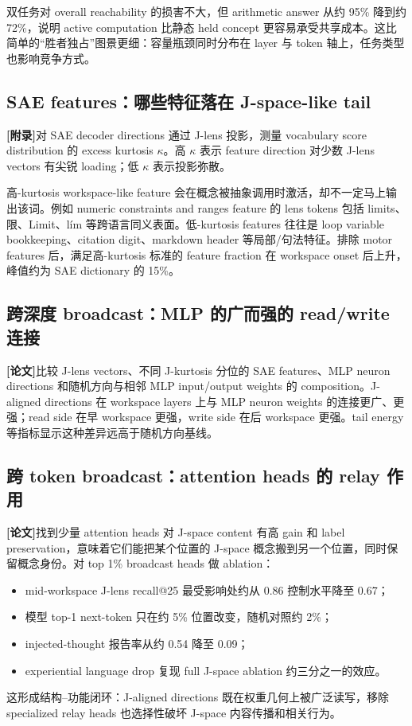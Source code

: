 \documentclass[10.5pt,a4paper]{ctexart}
\newcommand{\Paper}{\textbf{[论文]}}
\newcommand{\AppendixTag}{\textbf{[附录]}}
\begin{document}
双任务对 overall reachability 的损害不大，但 arithmetic answer 从约 95\% 降到约 72\%，说明 active computation 比静态 held concept 更容易承受共享成本。这比简单的“胜者独占”图景更细：容量瓶颈同时分布在 layer 与 token 轴上，任务类型也影响竞争方式。

\subsection{SAE features：哪些特征落在 J-space-like tail}
\AppendixTag 对 SAE decoder directions 通过 J-lens 投影，测量 vocabulary score distribution 的 excess kurtosis $\kappa$。高 $\kappa$ 表示 feature direction 对少数 J-lens vectors 有尖锐 loading；低 $\kappa$ 表示投影弥散。

高-kurtosis workspace-like feature 会在概念被抽象调用时激活，却不一定马上输出该词。例如 numeric constraints and ranges feature 的 lens tokens 包括 limits、限、Limit、lím 等跨语言同义表面。低-kurtosis features 往往是 loop variable bookkeeping、citation digit、markdown header 等局部/句法特征。排除 motor features 后，满足高-kurtosis 标准的 feature fraction 在 workspace onset 后上升，峰值约为 SAE dictionary 的 15\%。

\subsection{跨深度 broadcast：MLP 的广而强的 read/write 连接}
\Paper 比较 J-lens vectors、不同 J-kurtosis 分位的 SAE features、MLP neuron directions 和随机方向与相邻 MLP input/output weights 的 composition。J-aligned directions 在 workspace layers 上与 MLP neuron weights 的连接更广、更强；read side 在早 workspace 更强，write side 在后 workspace 更强。tail energy 等指标显示这种差异远高于随机方向基线。

\subsection{跨 token broadcast：attention heads 的 relay 作用}
\Paper 找到少量 attention heads 对 J-space content 有高 gain 和 label preservation，意味着它们能把某个位置的 J-space 概念搬到另一个位置，同时保留概念身份。对 top 1\% broadcast heads 做 ablation：
\begin{itemize}
\item mid-workspace J-lens recall@25 最受影响处约从 0.86 控制水平降至 0.67；
\item 模型 top-1 next-token 只在约 5\% 位置改变，随机对照约 2\%；
\item injected-thought 报告率从约 0.54 降至 0.09；
\item experiential language drop 复现 full J-space ablation 约三分之一的效应。
\end{itemize}
这形成结构--功能闭环：J-aligned directions 既在权重几何上被广泛读写，移除 specialized relay heads 也选择性破坏 J-space 内容传播和相关行为。
\end{document}
